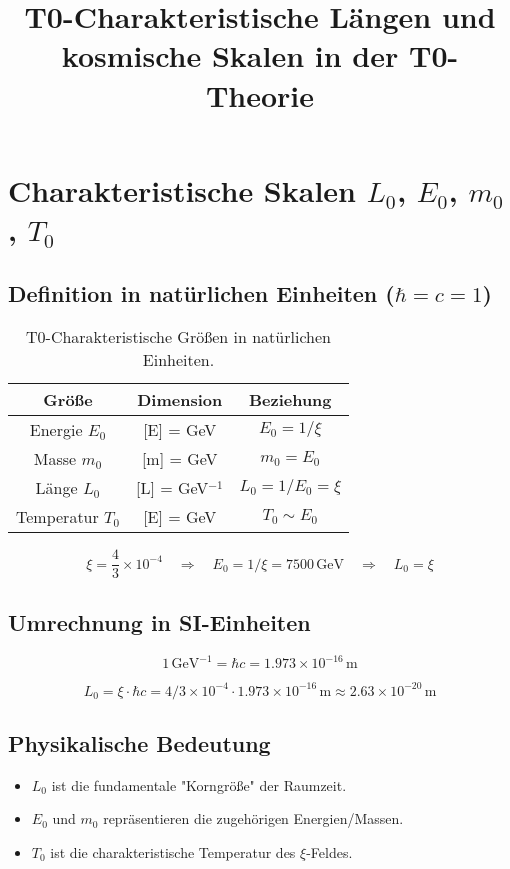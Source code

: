 \documentclass[12pt,a4paper]{article}
\title{T0-Charakteristische Längen und kosmische Skalen in der T0-Theorie}
\author{}
\date{}
\begin{document}
	
	\maketitle
	
	\section{Charakteristische Skalen $L_0$, $E_0$, $m_0$, $T_0$}
	
	\subsection{Definition in natürlichen Einheiten ($\hbar = c = 1$)}
	
	\begin{table}[h!]
		\centering
		\begin{tabular}{|c|c|c|}
			\hline
			\textbf{Größe} & \textbf{Dimension} & \textbf{Beziehung} \\
			\hline
			Energie $E_0$ & [E] = GeV & $E_0 = 1/\xi$ \\
			Masse $m_0$ & [m] = GeV & $m_0 = E_0$ \\
			Länge $L_0$ & [L] = GeV$^{-1}$ & $L_0 = 1/E_0 = \xi$ \\
			Temperatur $T_0$ & [E] = GeV & $T_0 \sim E_0$ \\
			\hline
		\end{tabular}
		\caption{T0-Charakteristische Größen in natürlichen Einheiten.}
	\end{table}
	
	\[
	\xi = \frac{4}{3} \times 10^{-4} \quad \Rightarrow \quad E_0 = 1/\xi = 7500 \,\text{GeV} \quad \Rightarrow \quad L_0 = \xi
	\]
	
	\subsection{Umrechnung in SI-Einheiten}
	
	\[
	1 \,\text{GeV}^{-1} = \hbar c = 1.973 \times 10^{-16}\,\text{m}
	\]
	
	\[
	L_0 = \xi \cdot \hbar c = 4/3 \times 10^{-4} \cdot 1.973 \times 10^{-16}\,\text{m} \approx 2.63 \times 10^{-20}\,\text{m}
	\]
	
	\subsection{Physikalische Bedeutung}
	
	\begin{itemize}
		\item $L_0$ ist die fundamentale "Korngröße" der Raumzeit.
		\item $E_0$ und $m_0$ repräsentieren die zugehörigen Energien/Massen.
		\item $T_0$ ist die charakteristische Temperatur des $\xi$-Feldes.
	\end{itemize}
	
\end{document}
